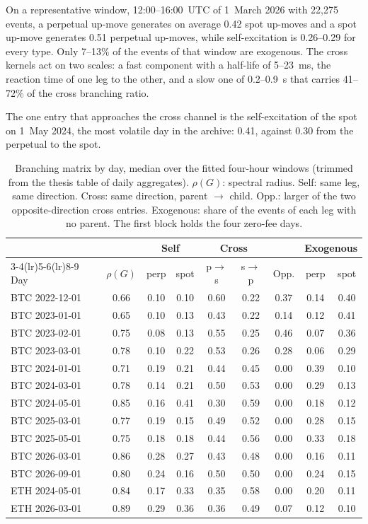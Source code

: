 \documentclass[a4paper,11pt]{article}
\begin{document}
On a representative window, 12:00--16:00~UTC of 1~March 2026 with 22,275 events, a perpetual up-move generates on average 0.42 spot up-moves and a spot up-move generates 0.51 perpetual up-moves, while self-excitation is 0.26--0.29 for every type. Only 7--13\% of the events of that window are exogenous. The cross kernels act on two scales: a fast component with a half-life of 5--23~ms, the reaction time of one leg to the other, and a slow one of 0.2--0.9~s that carries 41--72\% of the cross branching ratio.

The one entry that approaches the cross channel is the self-excitation of the spot on 1~May 2024, the most volatile day in the archive: 0.41, against 0.30 from the perpetual to the spot.

\begin{table}[htbp]
\centering
\caption{Branching matrix by day, median over the fitted four-hour windows (trimmed from the thesis table of daily aggregates). $\rho(G)$: spectral radius. Self: same leg, same direction. Cross: same direction, parent $\to$ child. Opp.: larger of the two opposite-direction cross entries. Exogenous: share of the events of each leg with no parent. The first block holds the four zero-fee days.}
\label{tab:G}
\small
\begin{tabular}{@{}lcccccccc@{}}
\toprule
 & & \multicolumn{2}{c}{Self} & \multicolumn{2}{c}{Cross} & & \multicolumn{2}{c}{Exogenous} \\
\cmidrule(lr){3-4}\cmidrule(lr){5-6}\cmidrule(lr){8-9}
Day & $\rho(G)$ & perp & spot & p$\to$s & s$\to$p & Opp. & perp & spot \\
\midrule
BTC 2022-12-01 & 0.66 & 0.10 & 0.10 & 0.60 & 0.22 & 0.37 & 0.14 & 0.40 \\
BTC 2023-01-01 & 0.65 & 0.10 & 0.13 & 0.43 & 0.22 & 0.14 & 0.12 & 0.41 \\
BTC 2023-02-01 & 0.75 & 0.08 & 0.13 & 0.55 & 0.25 & 0.46 & 0.07 & 0.36 \\
BTC 2023-03-01 & 0.78 & 0.10 & 0.22 & 0.53 & 0.26 & 0.28 & 0.06 & 0.29 \\
\midrule
BTC 2024-01-01 & 0.71 & 0.19 & 0.21 & 0.44 & 0.45 & 0.00 & 0.39 & 0.10 \\
BTC 2024-03-01 & 0.78 & 0.14 & 0.21 & 0.50 & 0.53 & 0.00 & 0.29 & 0.13 \\
BTC 2024-05-01 & 0.85 & 0.16 & 0.41 & 0.30 & 0.59 & 0.00 & 0.18 & 0.12 \\
BTC 2025-03-01 & 0.77 & 0.19 & 0.15 & 0.49 & 0.52 & 0.00 & 0.28 & 0.15 \\
BTC 2025-05-01 & 0.75 & 0.18 & 0.18 & 0.44 & 0.56 & 0.00 & 0.33 & 0.18 \\
BTC 2026-03-01 & 0.86 & 0.28 & 0.27 & 0.43 & 0.48 & 0.00 & 0.16 & 0.11 \\
BTC 2026-09-01 & 0.80 & 0.24 & 0.16 & 0.50 & 0.50 & 0.00 & 0.24 & 0.15 \\
\midrule
ETH 2024-05-01 & 0.84 & 0.17 & 0.33 & 0.35 & 0.58 & 0.00 & 0.20 & 0.11 \\
ETH 2026-03-01 & 0.89 & 0.29 & 0.36 & 0.36 & 0.49 & 0.07 & 0.12 & 0.10 \\
\bottomrule
\end{tabular}
\end{table}
\end{document}

